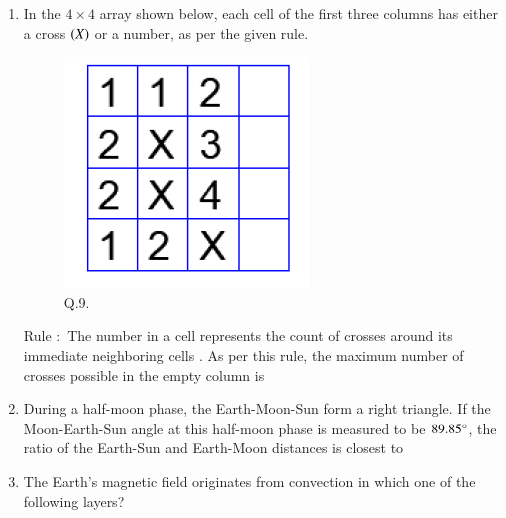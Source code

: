 \documentclass[journal,12pt,onecolumn]{IEEEtran}
\theoremstyle{remark}
\begin{document}
\begin{enumerate}
\item In the $4 \times 4$ array shown below, each cell of the first three columns has either a cross $\left(X\right)$ or a number, as per the given rule.
\begin{figure}[H]
    \centering
    \includegraphics[width=0.2\columnwidth]{Figs/fig_2.png}
    \caption{Q.9.}
    \label{fig:q9}
\end{figure}
Rule $\colon$ The number in a cell represents the count of crosses around its immediate neighboring cells .
As per this rule, the maximum number of crosses possible in the empty column is
\begin{enumerate}
\end{enumerate}
\hfill{}

\item During a half-moon phase, the Earth-Moon-Sun form a right triangle. If the Moon-Earth-Sun angle at this half-moon phase is measured to be $89.85\degree$, the ratio of the Earth-Sun and Earth-Moon distances is closest to
\begin{enumerate}
\end{enumerate}
\hfill{}

\item The Earth's magnetic field originates from convection in which one of the following layers?
\begin{enumerate}
\end{enumerate}
\hfill{}


\end{enumerate}
\end{document}
